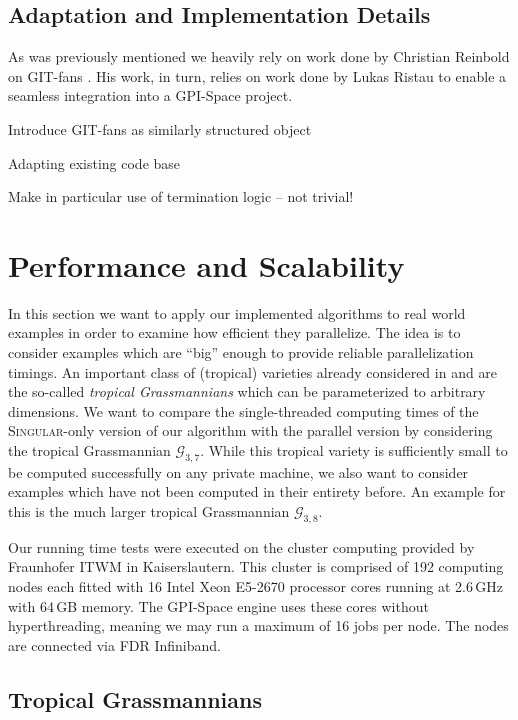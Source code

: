 \documentclass[
  paper=a4,
  titlepage,
  bibliography=totoc,
  listof=totoc,
  pagesize=pdftex
]{scrartcl}
\numberwithin{figure}{section}
\numberwithin{equation}{section}
\numberwithin{table}{section}
\theoremstyle{definition}
\numberwithin{definition}{section}
\begin{document}

\subsection{Adaptation and Implementation Details}

As was previously mentioned we heavily rely on work done by Christian Reinbold on
GIT-fans \cite{reinboldGitFan}. His work, in turn, relies on work done by Lukas Ristau to
enable a seamless integration into a GPI-Space project.

Introduce GIT-fans as similarly structured object

Adapting existing code base

Make in particular use of termination logic -- not trivial!

\section{Performance and Scalability}

In this section we want to apply our implemented algorithms to real world examples in
order to examine how efficient they parallelize. The idea is to consider examples which
are \enquote{big} enough to provide reliable parallelization timings. An important class
of (tropical) varieties already considered in \cite{tropPointsLinks} and \cite{tropGrass}
are the so-called \emph{tropical Grassmannians} which can be parameterized to arbitrary
dimensions. We want to compare the single-threaded computing times of the
\textsc{Singular}-only version of our algorithm with the parallel version by considering
the tropical Grassmannian $\mathcal G_{3,7}$. While this tropical variety is sufficiently
small to be computed successfully on any private machine, we also want to consider
examples which have not been computed in their entirety before. An example for this is the
much larger tropical Grassmannian $\mathcal G_{3,8}$.

Our running time tests were executed on the cluster computing provided by Fraunhofer ITWM
in Kaiserslautern. This cluster is comprised of 192 computing nodes each fitted with 16
Intel Xeon E5-2670 processor cores running at 2.6\,GHz with 64\,GB memory. The GPI-Space
engine uses these cores without hyperthreading, meaning we may run a maximum of 16 jobs
per node. The nodes are connected via FDR Infiniband.

\subsection{Tropical Grassmannians}
\end{document}
